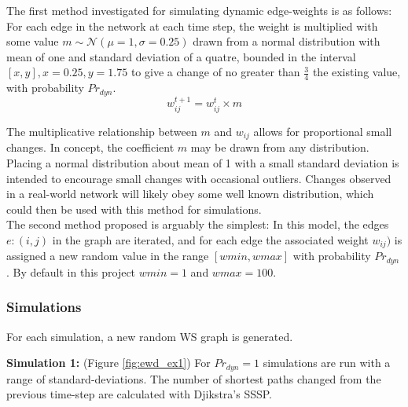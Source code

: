 \documentclass[
	a4paper, %
	10pt, %
	unnumberedsections, %
	twoside, %
]{LTJournalArticle}
\begin{document}
The first method investigated for simulating dynamic edge-weights is as follows: For each edge in the network at each time step, the weight is multiplied with some value \(m \sim \mathcal{N}(\mu = 1, \sigma = 0.25)\) drawn from a normal distribution with mean of one and standard deviation of a quatre, bounded in the interval \([x, y], x = 0.25, y = 1.75\) to give a change of no greater than \(\frac{3}{4}\) the existing value, with probability \(Pr_{dyn}\). \\

\begin{equation}
	w_{ij}^{t+1} = w_{ij}^{t} \times m
	\label{eq:weight_mult}
\end{equation}

The multiplicative relationship between \(m\) and \(w_{ij}\) allows for proportional small changes. In concept, the coefficient \(m\) may be drawn from any distribution. Placing a normal distribution about mean of 1 with a small standard deviation is intended to encourage small changes with occasional outliers. Changes observed in a real-world network will likely obey some well known distribution, which could then be used with this method for simulations. \\

The second method proposed is arguably the simplest: In this model, the edges \(e: (i, j)\) in the graph are iterated, and for each edge the associated weight \(w_{ij})\) is assigned a new random value in the range \([wmin, wmax]\) with probability \(Pr_{dyn}\). By default in this project \(wmin = 1\) and \(wmax = 100\).  \\

\subsubsection{Simulations}

For each simulation, a new random WS graph is generated. 

\textbf{Simulation 1:} (Figure \ref{fig:ewd_ex1})  For \(Pr_{dyn} = 1\)  simulations are run with a range of standard-deviations. The number of shortest paths changed from the previous time-step are calculated with Djikstra's SSSP.  
\end{document}

